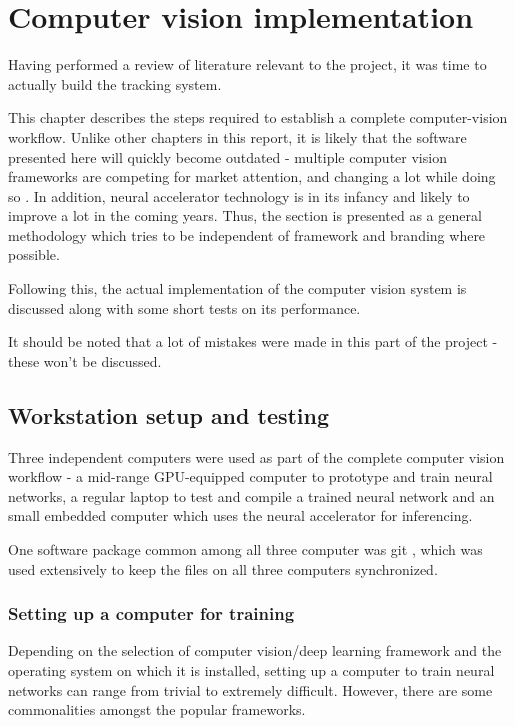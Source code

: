 \chapter{Computer vision implementation}

Having performed a review of literature relevant to the project, it was time to actually build the tracking system.

This chapter describes the steps required to establish a complete computer-vision workflow. Unlike other chapters in this report, it is likely that the software presented here will quickly become outdated - multiple computer vision frameworks are competing for market attention, and changing a lot while doing so \cite{website:comparison_deep_learning_software}. In addition, neural accelerator technology is in its infancy and likely to improve a lot in the coming years. Thus, the section is presented as a general methodology which tries to be independent of framework and branding where possible.

Following this, the actual implementation of the computer vision system is discussed along with some short tests on its performance.

It should be noted that a lot of mistakes were made in this part of the project - these won't be discussed.

\section{Workstation setup and testing}
Three independent computers were used as part of the complete computer vision workflow - a mid-range GPU-equipped computer to prototype and train neural networks, a regular laptop to test and compile a trained neural network and an small embedded computer which uses the neural accelerator for inferencing.

One software package common among all three computer was git \cite{git}, which was used extensively to keep the files on all three computers synchronized.

\subsection{Setting up a computer for training}
Depending on the selection of computer vision/deep learning framework and the operating system on which it is installed, setting up a computer to train neural networks can range from trivial to extremely difficult. However, there are some commonalities amongst the popular frameworks.

